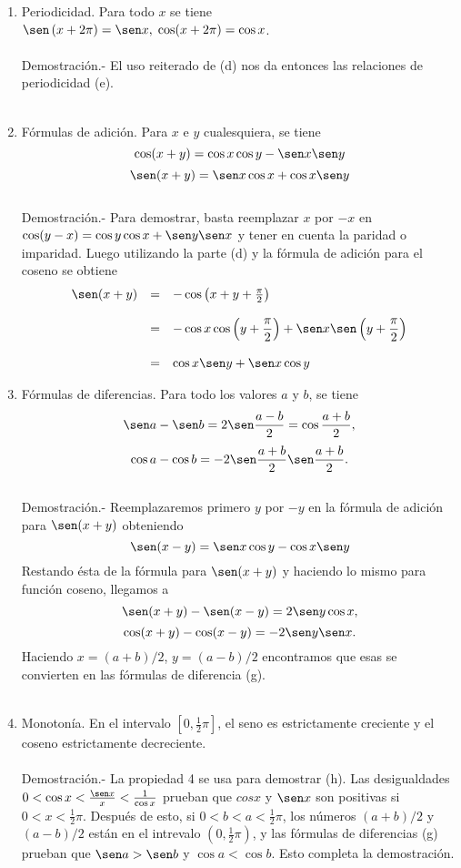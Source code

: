 \begin{teo}
\begin{enumerate}[\bfseries (a)]
	\item Periodicidad. Para todo $x$ se tiene $\sen\left(x+2\pi \right) = \sen x, \; \cos(x+2\pi) = \cos x$.\\\\
	    Demostración.-\; El uso reiterado de (d) nos da entonces las relaciones de periodicidad (e).\\\\
	
	\item Fórmulas de adición. Para $x$ e $y$ cualesquiera, se tiene 
	    $$\cos (x+y) = \cos x \cos y - \sen x \sen y$$
	    $$\sen (x+y) = \sen x \cos x + \cos x \sen y$$\\
	    Demostración.-\; Para demostrar, basta reemplazar $x$ por $-x$ en  $\cos(y-x) = \cos y \cos x + \sen y \sen x$ y tener en cuenta la paridad o imparidad. Luego utilizando la parte (d) y la fórmula de adición para el coseno se obtiene 
	    $$\begin{array}{rcl}
		\sen(x+y) &=& -\cos \left(x+y+\frac{\pi}{2}\right)\\\\
			  &=&-\cos x \cos \left(y+\dfrac{\pi}{2}\right) + \sen x \sen \left(y + \dfrac{\pi}{2}\right)\\\\
			  &=& \cos x\sen y + \sen x \cos y
	    \end{array}$$
	    \vspace{.5cm}

	\item  Fórmulas de diferencias. Para todo los valores $a$ y $b$, se tiene 
	    $$\sen a - \sen b = 2\sen \dfrac{a-b}{2} = \cos \dfrac{a+b}{2},$$
	    $$\cos a - \cos b = -2 \sen \dfrac{a+b}{2} \sen \dfrac{a+b}{2}.$$\\
	    Demostración.-\; Reemplazaremos primero $y$ por $-y$ en la fórmula de adición para $\sen(x+y)$ obteniendo $$\sen(x-y)=\sen x \cos y - \cos x \sen y$$
	    Restando ésta de la fórmula para $\sen(x+y)$ y haciendo lo mismo para función coseno, llegamos a
	    $$\sen(x+y) -\sen(x-y) =  2\sen y \cos x,$$
	    $$\cos(x+y) - \cos(x-y) = -2\sen y \sen x.$$
	    Haciendo $x=(a+b)/2$,  $y=(a-b)/2$ encontramos que esas se convierten en las fórmulas de diferencia (g).\\\\

	\item Monotonía. En el intervalo $[0,\frac{1}{2}\pi]$, el seno es estrictamente creciente y el coseno estrictamente decreciente.\\\\
	    Demostración.-\; La propiedad 4 se usa para demostrar (h). Las desigualdades $0<\cos x < \frac{\sen x}{x}<\frac{1}{\cos x}$ prueban que $cos x$ y $\sen x$ son positivas si $0<x<\frac{1}{2}\pi$. Después de esto, si $0<b<a<\frac{1}{2}\pi$, los números $(a+b)/2$ y $(a-b)/2$ están en el intrevalo $(0,\frac{1}{2}\pi)$, y las fórmulas de diferencias (g) prueban que $\sen a > \sen b$ y $\cos a < \cos b$. Esto completa la demostración.\\\\


\end{enumerate}
\end{teo}
